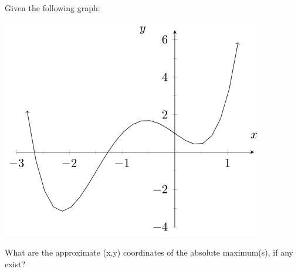 \documentclass{ximera}
\begin{document}
\begin{problem}
    Given the following graph:  
    \begin{center}
        \includegraphics{./Picture12.png}
    \end{center}
    What are the approximate (x,y) coordinates of the absolute maximum(s), if any exist?
    \begin{multipleChoice}
    \end{multipleChoice}
\end{problem}
\end{document}
